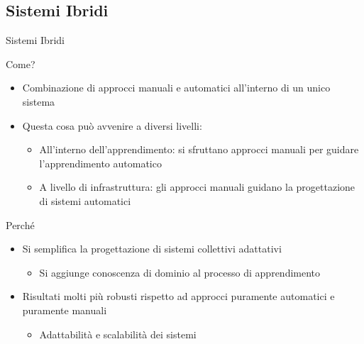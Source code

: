 \documentclass[presentation, 10pt,aspectratio=169]{beamer}\mode<presentation>{\usetheme{AMSBolognaFC}}
\begin{document}
	\subsection{Sistemi Ibridi}
\begin{frame}{Sistemi Ibridi}
	\begin{exampleblock}{Come?}
		\begin{itemize}
			\item Combinazione di approcci manuali e automatici all'interno di un unico sistema
			\item Questa cosa può avvenire a diversi livelli:
			\begin{itemize}
				\item All'interno dell'apprendimento: si sfruttano approcci manuali per guidare l'apprendimento automatico
				\item A livello di infrastruttura: gli approcci manuali guidano la progettazione di sistemi automatici
			\end{itemize}
		\end{itemize}
	\end{exampleblock}
	\begin{alertblock}{Perché}
		\begin{itemize}
			\item Si semplifica la progettazione di sistemi collettivi adattativi
			\begin{itemize}
				\item Si aggiunge conoscenza di dominio al processo di apprendimento
			\end{itemize}

			\item Risultati molti più robusti rispetto ad approcci puramente automatici e puramente manuali
			\begin{itemize}
				\item Adattabilità e scalabilità dei sistemi
			\end{itemize}
		\end{itemize}
	\end{alertblock}
\end{frame}
\end{document}
